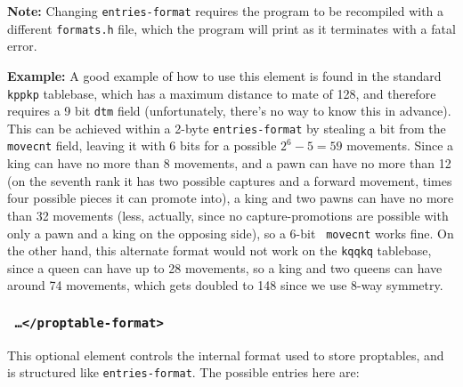 \documentclass[11pt]{article}
\begin{document}
{\bf Note:} Changing {\tt entries-format} requires the program to be
recompiled with a different {\tt formats.h} file, which the
program will print as it terminates with a fatal error.

{\bf Example:} A good example of how to use this element is found in
the standard {\tt kppkp} tablebase, which has a maximum distance to
mate of 128, and therefore requires a 9 bit {\tt dtm} field
(unfortunately, there's no way to know this in advance).  This can be
achieved within a 2-byte {\tt entries-format} by stealing a bit from
the {\tt movecnt} field, leaving it with 6 bits for a possible $2^6 -
5 = 59$ movements.  Since a king can have no more than 8 movements,
and a pawn can have no more than 12 (on the seventh rank it has two
possible captures and a forward movement, times four possible pieces
it can promote into), a king and two pawns can have no more than 32
movements (less, actually, since no capture-promotions are possible
with only a pawn and a king on the opposing side), so a 6-bit {\tt
movecnt} works fine.  On the other hand, this alternate format would
not work on the {\tt kqqkq} tablebase, since a queen can have up to 28
movements, so a king and two queens can have around 74 movements, which
gets doubled to 148 since we use 8-way symmetry.


\subsubsection{\tt <proptable-format> \ldots\quad </proptable-format>}

This optional element controls the internal format used to store
proptables, and is structured like {\tt entries-format}.
The possible entries here are:
\end{document}
